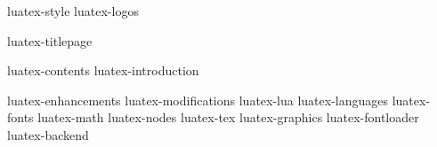 

\environment luatex-style
\environment luatex-logos

\dontcomplain

\startdocument
  [version=0.95.0,
   status=Pre-release]

\component luatex-titlepage

\startfrontmatter
    \component luatex-contents
    \component luatex-introduction
\stopfrontmatter

\startbodymatter
    \component luatex-enhancements
    \component luatex-modifications
    \component luatex-lua
    \component luatex-languages
    \component luatex-fonts
    \component luatex-math
    \component luatex-nodes
    \component luatex-tex
    \component luatex-graphics
    \component luatex-fontloader
    \component luatex-backend
\stopbodymatter

\stopdocument
